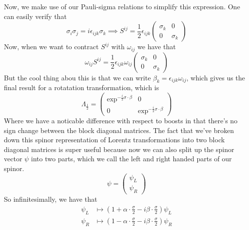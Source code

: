 Now, we make use of our Pauli-sigma relations to simplify this expression. One can easily verify that \[ \sigma_i \sigma_j = i \epsilon_{ ijk} \sigma_k  \implies S^{ ij } = \frac{1}{ 2} \epsilon_{ ijk} \begin{pmatrix} \sigma_k & 0 \\ 0 & \sigma_k \end{pmatrix} \]
Now, when we want to contract $S^{ ij }$ with $\omega_{ ij } $ we have that 
\[ 
\omega_{ ij} S^{ ij } = \frac{1}{ 2} \epsilon_{ ijk } \omega_{ ij} \begin{pmatrix} \sigma_k & 0 \\ 0 & \sigma_k \end{pmatrix} \]
But the cool thing abou this is that we can write $\beta_k = \epsilon_{ ijk} \omega_{ij }  $, which gives us the final result for a rotatation transformation, which is 
\[ \Lambda_{\frac{ 1}{ 2} }  = \begin{pmatrix}  \exp^{ - \frac{i}{2} \sigma \cdot \beta } & 0 \\ 0 & \exp^{ - \frac{ i}{ 2} \sigma \cdot \beta } \end{pmatrix} \] 
Where we have a noticable difference with respect to boosts in that there's no sign change between the block diagonal matrices. The fact that we've broken down this spinor representation of Lorentz transformations into two block diagonal matrices is super useful because now we can also split up the spinor vector $ \psi $ into two parts, which we call the left and right handed parts of our spinor. 
\[ \psi = \begin{pmatrix} \psi_L \\ \psi_R \end{pmatrix} \] 
So infinitesimally, we have that \begin{align*} 
\psi_L & \mapsto \left( 1 + \alpha \cdot \frac{ \sigma}{2}  - i  \beta \cdot \frac{\sigma}{2} \right)  \psi_L \\ 
\psi_R & \mapsto \left(  1  -  \alpha \cdot \frac{\sigma}{2}  - i \beta \cdot \frac{\sigma}{ 2} \right)  \psi_R 
\end{align*} 

